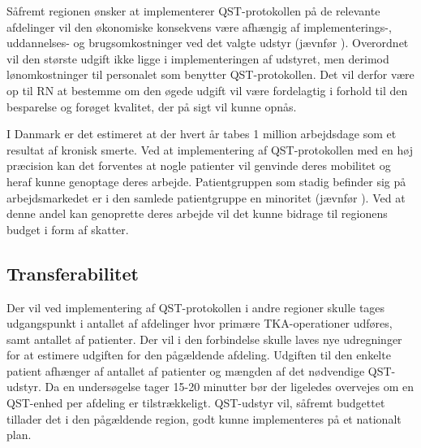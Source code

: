 Såfremt regionen ønsker at implementerer QST-protokollen på de relevante afdelinger vil den økonomiske konsekvens være afhængig af implementerings-, uddannelses- og brugsomkostninger ved det valgte udstyr (jævnfør ). Overordnet vil den største udgift ikke ligge i implementeringen af udstyret, men derimod lønomkostninger til personalet som benytter QST-protokollen. Det vil derfor være op til RN at bestemme om den øgede udgift vil være fordelagtig i forhold til den besparelse og forøget kvalitet, der på sigt vil kunne opnås. 

I Danmark er det estimeret at der hvert år tabes 1 million arbejdsdage som et resultat af kronisk smerte. \citep{Eriksen2006} Ved at implementering af QST-protokollen med en høj præcision kan det forventes at nogle patienter vil genvinde deres mobilitet og heraf kunne genoptage deres arbejde. Patientgruppen som stadig befinder sig på arbejdsmarkedet er i den samlede patientgruppe en minoritet (jævnfør ). Ved at denne andel kan genoprette deres arbejde vil det kunne bidrage til regionens budget i form af skatter.

\subsection{Transferabilitet}
Der vil ved implementering af QST-protokollen i andre regioner skulle tages udgangspunkt i antallet af afdelinger hvor primære TKA-operationer udføres, samt antallet af patienter. Der vil i den forbindelse skulle laves nye udregninger for at estimere udgiften for den pågældende afdeling. Udgiften til den enkelte patient afhænger af antallet af patienter og mængden af det nødvendige QST-udstyr. Da en undersøgelse tager 15-20 minutter bør der ligeledes overvejes om en QST-enhed per afdeling er tilstrækkeligt. QST-udstyr vil, såfremt budgettet tillader det i den pågældende region, godt kunne implementeres på et nationalt plan.

